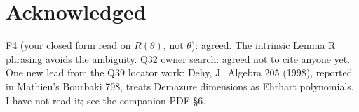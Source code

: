 \documentclass[10pt]{amsart}
\begin{document}
\section{Acknowledged}
F4 (your closed form read on $R(\theta)$, not $\theta$): agreed. The intrinsic Lemma R phrasing avoids the ambiguity. Q32 owner
search: agreed not to cite anyone yet. One new lead from the Q39 locator work: Dehy, J.~Algebra 205 (1998), reported in Mathieu's
Bourbaki 798, treats Demazure dimensions as Ehrhart polynomials. I have not read it; see the companion PDF \S6.
\end{document}
